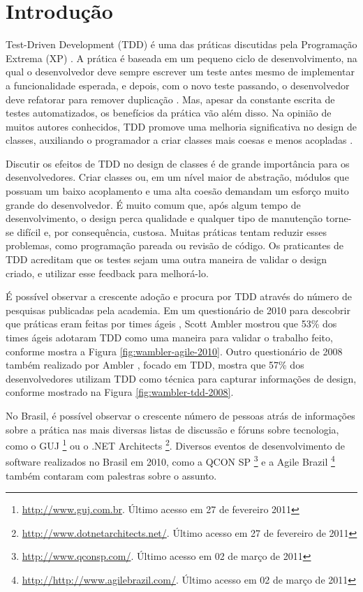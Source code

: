 \chapter{Introdução}
\label{cap:introducao}

Test-Driven Development (TDD) é uma das práticas discutidas pela Programação
Extrema (XP) \cite{XPExplained}. A prática é baseada em um pequeno ciclo de
desenvolvimento, na qual o desenvolvedor deve sempre escrever um teste antes
mesmo de implementar a funcionalidade esperada, e depois, com o novo teste
passando, o desenvolvedor deve refatorar para remover duplicação
\cite{TDDByExample}.
Mas, apesar da constante escrita de testes automatizados, os benefícios da
prática vão além disso. Na opinião de muitos autores conhecidos, TDD promove
uma melhoria significativa no design de classes, auxiliando o programador a
criar classes mais coesas e menos acopladas \cite{TDDByExample} \cite{GOOS} 
\cite{astels-tdd}.

Discutir os efeitos de TDD no design de classes é de grande importância para os
desenvolvedores.
Criar classes ou, em um nível maior de abstração, módulos que possuam um baixo
acoplamento e uma alta coesão demandam um esforço muito grande do desenvolvedor. 
É muito comum que, após algum tempo de desenvolvimento, o design perca qualidade
e qualquer tipo de manutenção torne-se difícil e, por consequência, custosa.
Muitas práticas tentam reduzir esses problemas, como programação pareada ou
revisão de código. Os praticantes de TDD acreditam que os testes sejam uma outra
maneira de validar o design criado, e utilizar esse feedback para melhorá-lo.

É possível observar a crescente adoção e procura por TDD
através do número de pesquisas publicadas pela academia.
Em um questionário de 2010 para descobrir que práticas eram feitas por times
ágeis \cite{wambler-survey-agile}, Scott Ambler mostrou que 53\% dos times ágeis
adotaram TDD como uma maneira para validar o trabalho feito, conforme mostra a 
Figura \ref{fig:wambler-agile-2010}. Outro questionário de 2008 também realizado por Ambler
\cite{wambler-survey-tdd}, focado em TDD, mostra que 57\% dos desenvolvedores 
utilizam TDD como técnica para capturar informações de design, conforme mostrado
na Figura \ref{fig:wambler-tdd-2008}.

No Brasil, é possível observar o crescente número de pessoas atrás de
informações sobre a prática nas mais diversas listas de discussão e fóruns sobre
tecnologia, como o GUJ \footnote{\url{http://www.guj.com.br}.
Último acesso em 27 de fevereiro 2011} ou o .NET Architects 
\footnote{\url{http://www.dotnetarchitects.net/}. Último acesso em
27 de fevereiro de 2011}. Diversos eventos de desenvolvimento de
software realizados no Brasil em 2010, como a QCON SP
\footnote{\url{http://www.qconsp.com/}. Último acesso em 02 de março de 2011} e
a Agile Brazil \footnote{\url{http://http://www.agilebrazil.com/}. Último acesso
em 02 de março de 2011} também contaram com palestras sobre o assunto.

